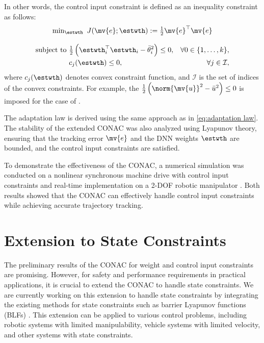\documentclass[letterpaper, 10 pt, conference]{ieeeconf}  %
\begin{document}
In other words, the control input constraint is defined as an inequality constraint as follows:
\begin{equation}
    \begin{matrix}
        \min_{\estwth} \ J(\mv{e};\estwth):= 
        \tfrac{1}{2} \mv{e}^\top \mv{e}
        \\ \\
        \begin{aligned}
        \text{subject to }&
        \tfrac{1}{2}
            \left(
                \estwth_i^\top \estwth_i - {\bar\theta}_i^2
            \right)
        \le0, &\forall 0\in\{1,\ldots,k\}, \\
        &
        c_j(\estwth) \le 0, &\forall j\in\mathcal{I}
        ,
        \end{aligned}
    \end{matrix}
    \label{eq:opt:problem2}
\end{equation}
where $c_j(\estwth)$ denotes convex constraint function, and $\mathcal{I}$ is the set of indices of the convex constraints.
For example, the 
$
    \tfrac{1}{2}
    \left(
        \norm{\mv{u}}^2 - {\bar u}^2
    \right)
    \le0
$
is imposed for the case of \cite{Ryu:2024ab}.

The adaptation law is derived using the same approach as in \eqref{eq:adaptation law}.
The stability of the extended CONAC was also analyzed using Lyapunov theory, ensuring that the tracking error $\mv{e}$ and the DNN weights $\estwth$ are bounded, and the control input constraints are satisfied.

To demonstrate the effectiveness of the CONAC, a numerical simulation was conducted on a nonlinear synchronous machine drive with control input constraints \cite{Ryu:2024ab} and real-time implementation on a 2-DOF robotic manipulator \cite{Ryu:2025aa}.
Both results showed that the CONAC can effectively handle control input constraints while achieving accurate trajectory tracking.

\section{Extension to State Constraints}

The preliminary results of the CONAC for weight and control input constraints are promising.
However, for safety and performance requirements in practical applications, it is crucial to extend the CONAC to handle state constraints.
We are currently working on this extension to handle state constraints by integrating the existing methods for state constraints such as barrier Lyapunov functions (BLFs) \cite{Ames:2019aa}.
This extension can be applied to various control problems, including robotic systems with limited manipulability, vehicle systems with limited velocity, and other systems with state constraints.
\end{document}
